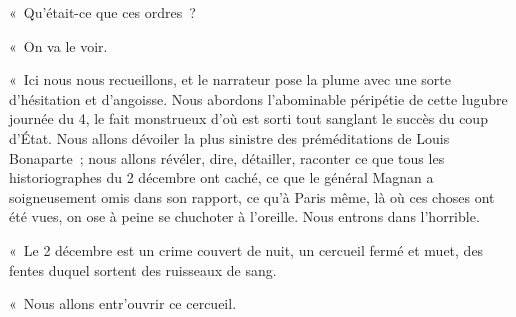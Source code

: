 \documentclass[french,twoside]{book} %
\begin{document}
« Qu’était-ce que ces ordres ?\par
« On va le voir.\par
« Ici nous nous recueillons, et le narrateur pose la plume avec une sorte d’hésitation et d’angoisse. Nous abordons l’abominable péripétie de cette lugubre journée du 4, le fait monstrueux d’où est sorti tout sanglant le succès du coup d’État. Nous allons dévoiler la plus sinistre des préméditations de Louis Bonaparte ; nous allons révéler, dire, détailler, raconter ce que tous les historiographes du 2 décembre ont caché, ce que le général Magnan a soigneusement omis dans son rapport, ce qu’à Paris même, là où ces choses ont été vues, on ose à peine se chuchoter à l’oreille. Nous entrons dans l’horrible.\par
« Le 2 décembre est un crime couvert de nuit, un cercueil fermé et muet, des fentes duquel sortent des ruisseaux de sang.\par
« Nous allons entr’ouvrir ce cercueil.
\end{document}
